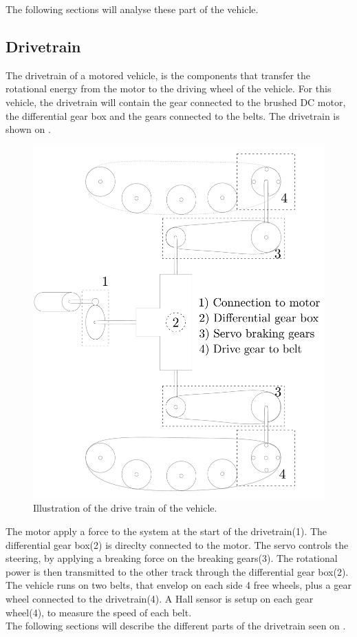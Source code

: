 The following sections will analyse these part of the vehicle.

\subsection{Drivetrain}

The drivetrain of a motored vehicle, is the components that transfer the rotational energy from the motor to the driving wheel of the vehicle. For this vehicle, the drivetrain will contain the gear connected to the brushed DC motor, the differential gear box and the gears connected to the belts. The drivetrain is shown on .

\begin{figure}[H]
	\centering
	\includegraphics[scale=0.2]{figures/vehicleDescriptionDriveTrain.pdf}
	\caption{Illustration of the drive train of the vehicle.}
	\label{vehicleDescriptionDriveTrain}
\end{figure}

The motor apply a force to the system at the start of the drivetrain(1). The differential gear box(2) is direclty connected to the motor. The servo controls the steering, by applying a breaking force on the breaking gears(3). The rotational power is then transmitted to the other track through the differential gear box(2). The vehicle runs on two belts, that envelop on each side 4 free wheels, plus a gear wheel connected to the drivetrain(4). A Hall sensor is setup on each gear wheel(4), to measure the speed of each belt.\\
The following sections will describe the different parts of the drivetrain seen on .\\